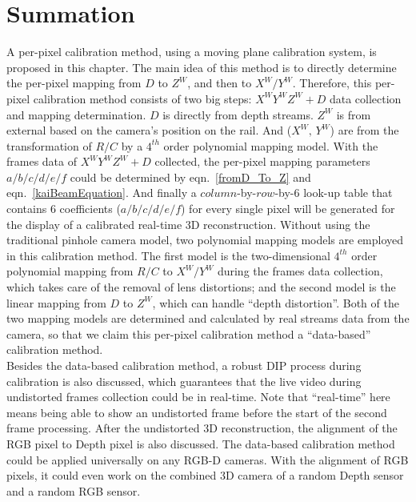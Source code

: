 \section{Summation}
A per-pixel calibration method, using a moving plane calibration system, is proposed in this chapter. The main idea of this method is to directly determine the per-pixel mapping from \(D\) to \(Z^W\), and then to \(X^W/Y^W\). Therefore, this per-pixel calibration method consists of two big steps: \(X^WY^WZ^W+D\) data collection and mapping determination. \(D\) is directly from depth streams. \(Z^W\) is from external based on the camera's position on the rail. And (\(X^W, \, Y^W\)) are from the transformation of \(R/C\) by a \(4^{th}\) order polynomial mapping model. With the frames data of \(X^WY^WZ^W+D\) collected, the per-pixel mapping parameters \(a/b/c/d/e/f\) could be determined by eqn.~\ref{fromD_To_Z} and eqn.~\ref{kaiBeamEquation}. And finally a \(column\)-by-\(row\)-by-\(6\) look-up table that contains 6 coefficients (\(a/b/c/d/e/f\)) for every single pixel will be generated for the display of a calibrated real-time 3D reconstruction. %
Without using the traditional pinhole camera model, two polynomial mapping models are employed in this calibration method. The first model is the two-dimensional \(4^{th}\) order polynomial mapping from \(R/C\) to \(X^W/Y^W\) during the frames data collection, which takes care of the removal of lens distortions; and the second model is the linear mapping from \(D\) to \(Z^W\), which can handle \enquote{depth distortion}. Both of the two mapping models are determined and calculated by real streams data from the camera, so that we claim this per-pixel calibration method a \enquote{data-based} calibration method. 
\\\indent
Besides the data-based calibration method, a robust DIP process during calibration is also discussed, which guarantees that the live video during undistorted frames collection could be in real-time. Note that \enquote{real-time} here means being able to show an undistorted frame before the start of the second frame processing. After the undistorted 3D reconstruction, the alignment of the RGB pixel to Depth pixel is also discussed. The data-based calibration method could be applied universally on any RGB-D cameras. With the alignment of RGB pixels, it could even work on the combined 3D camera of a random Depth sensor and a random RGB sensor.






























